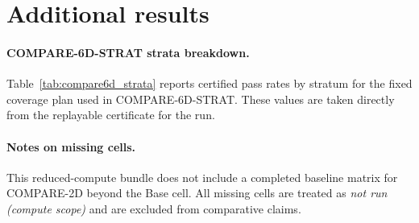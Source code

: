 \section{Additional results}

\paragraph{COMPARE-6D-STRAT strata breakdown.}
Table~\ref{tab:compare6d_strata} reports certified pass rates by stratum for the fixed coverage plan used in COMPARE-6D-STRAT.
These values are taken directly from the replayable certificate for the run.



\paragraph{Notes on missing cells.}
This reduced-compute bundle does not include a completed baseline matrix for COMPARE-2D beyond the Base cell.
All missing cells are treated as \emph{not run (compute scope)} and are excluded from comparative claims.
